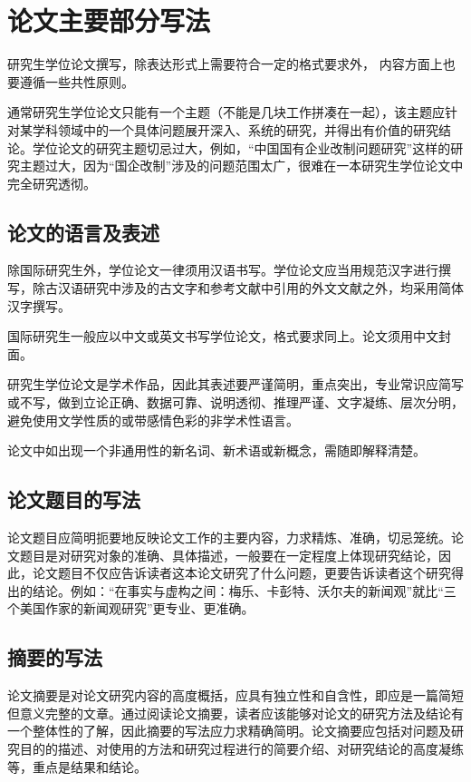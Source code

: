 
\chapter{论文主要部分写法}
研究生学位论文撰写，除表达形式上需要符合一定的格式要求外，
内容方面上也要遵循一些共性原则。

通常研究生学位论文只能有一个主题（不能是几块工作拼凑在一起），该主题应针对某学科领域中的一个具体问题展开深入、系统的研究，并得出有价值的研究结论。学位论文的研究主题切忌过大，例如，“中国国有企业改制问题研究”这样的研究主题过大，因为“国企改制”涉及的问题范围太广，很难在一本研究生学位论文中完全研究透彻。

\section{论文的语言及表述}
除国际研究生外，学位论文一律须用汉语书写。学位论文应当用规范汉字进行撰写，除古汉语研究中涉及的古文字和参考文献中引用的外文文献之外，均采用简体汉字撰写。

国际研究生一般应以中文或英文书写学位论文，格式要求同上。论文须用中文封面。

研究生学位论文是学术作品，因此其表述要严谨简明，重点突出，专业常识应简写或不写，做到立论正确、数据可靠、说明透彻、推理严谨、文字凝练、层次分明，避免使用文学性质的或带感情色彩的非学术性语言。

论文中如出现一个非通用性的新名词、新术语或新概念，需随即解释清楚。

\section{论文题目的写法}
论文题目应简明扼要地反映论文工作的主要内容，力求精炼、准确，切忌笼统。论文题目是对研究对象的准确、具体描述，一般要在一定程度上体现研究结论，因此，论文题目不仅应告诉读者这本论文研究了什么问题，更要告诉读者这个研究得出的结论。例如：“在事实与虚构之间：梅乐、卡彭特、沃尔夫的新闻观”就比“三个美国作家的新闻观研究”更专业、更准确。

\section{摘要的写法}
论文摘要是对论文研究内容的高度概括，应具有独立性和自含性，即应是一篇简短但意义完整的文章。通过阅读论文摘要，读者应该能够对论文的研究方法及结论有一个整体性的了解，因此摘要的写法应力求精确简明。论文摘要应包括对问题及研究目的的描述、对使用的方法和研究过程进行的简要介绍、对研究结论的高度凝练等，重点是结果和结论。

